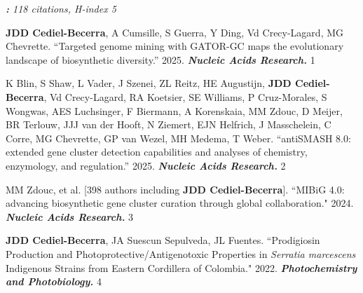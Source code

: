 
\textit{\textbf{:} 118 citations, H-index 5}

 \vspace{-2mm}

\begin{cvpubs}

\cvpub
{\textbf{JDD Cediel-Becerra}, A Cumsille, S Guerra, Y Ding, Vd Crecy-Lagard, MG Chevrette. ``Targeted genome mining with GATOR-GC maps the evolutionary landscape of biosynthetic diversity.'' 2025. \textit{\textbf{Nucleic Acids Research.}} \textit{\textbf{}}}
{1}

\cvpub
{K Blin, S Shaw, L Vader, J Szenei, ZL Reitz, HE Augustijn, \textbf{JDD Cediel-Becerra}, Vd Crecy-Lagard, RA Koetsier, SE Williams, P Cruz-Morales, S Wongwas, AES Luchsinger, F Biermann, A Korenskaia, MM Zdouc, D Meijer, BR Terlouw, JJJ van der Hooft, N Ziemert, EJN Helfrich, J Masschelein, C Corre, MG Chevrette, GP van Wezel, MH Medema, T Weber. ``antiSMASH 8.0: extended gene cluster detection capabilities and analyses of chemistry, enzymology, and regulation.'' 2025. \textit{\textbf{Nucleic Acids Research.}} \textit{\textbf{}}}
{2}

\cvpub
{MM Zdouc, et al. [398 authors including \textbf{JDD Cediel-Becerra}]. ``MIBiG 4.0: advancing biosynthetic gene cluster curation through global collaboration." 2024. \textit{\textbf{Nucleic Acids Research.}} \textit{\textbf{}}}
{3}

\cvpub
{\textbf{JDD Cediel-Becerra}, JA Suescun Sepulveda, JL Fuentes. ``Prodigiosin Production and Photoprotective/Antigenotoxic Properties in \textit{Serratia marcescens} Indigenous Strains from Eastern Cordillera of Colombia." 2022. \textit{\textbf{Photochemistry and Photobiology.}}\textit{\textbf{}}}
{4}
\end{cvpubs}


 \vspace{-2mm}

